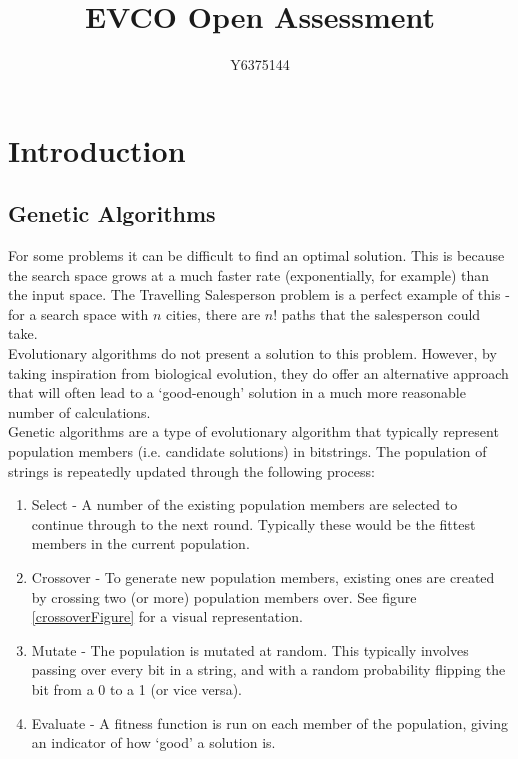 \documentclass[]{report}
\title{EVCO Open Assessment}
\author{Y6375144}
\begin{document}
\maketitle

\chapter{Introduction}

\section{Genetic Algorithms}

For some problems it can be difficult to find an optimal solution. This is because the search space grows at a much faster rate (exponentially, for example) than the input space. The Travelling Salesperson problem is a perfect example of this - for a search space with $n$ cities, there are $n!$ paths that the salesperson could take.\\

Evolutionary algorithms do not present a solution to this problem. However, by taking inspiration from biological evolution, they do offer an alternative approach that will often lead to a `good-enough' solution in a much more reasonable number of calculations. \\

Genetic algorithms are a type of evolutionary algorithm that typically represent population members (i.e. candidate solutions) in bitstrings. The population of strings is repeatedly updated through the following process:

\begin{enumerate}
	\item Select - A number of the existing population members are selected to continue through to the next round. Typically these would be the fittest members in the current population.
	\item Crossover - To generate new population members, existing ones are created by crossing two (or more) population members over. See figure \ref{crossoverFigure} for a visual representation.
	\item Mutate - The population is mutated at random. This typically involves passing over every bit in a string, and with a random probability flipping the bit from a 0 to a 1 (or vice versa).
	\item Evaluate - A fitness function is run on each member of the population, giving an indicator of how `good' a solution is.
\end{enumerate}
\end{document}
